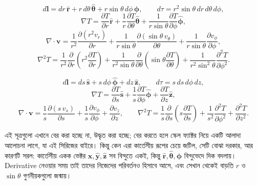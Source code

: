 \documentclass[11pt]{article}
\begin{document}
\begin{idea}[Spherical স্থানাঙ্কে]
\[
  d\mathbf{l} = dr\,\hat{\mathbf{r}} + r\,d\theta\,\hat{\boldsymbol{\theta}}
  + r\sin\theta\,d\phi\,\hat{\boldsymbol{\phi}}, \qquad
  d\tau = r^{2}\sin\theta\,dr\,d\theta\,d\phi ,
\]
\[
  \nabla T = \frac{\partial T}{\partial r}\hat{\mathbf{r}}
  + \frac{1}{r}\frac{\partial T}{\partial\theta}\hat{\boldsymbol{\theta}}
  + \frac{1}{r\sin\theta}\frac{\partial T}{\partial\phi}
  \hat{\boldsymbol{\phi}} ,
\]
\[
  \nabla\cdot\mathbf{v} = \frac{1}{r^{2}}
  \frac{\partial\left( r^{2}v_{r} \right)}{\partial r}
  + \frac{1}{r\sin\theta}
  \frac{\partial\left( \sin\theta\,v_{\theta} \right)}{\partial\theta}
  + \frac{1}{r\sin\theta}\frac{\partial v_{\phi}}{\partial\phi} ,
\]
\[
  \nabla^{2}T = \frac{1}{r^{2}}\frac{\partial}{\partial r}
  \left( r^{2}\frac{\partial T}{\partial r} \right)
  + \frac{1}{r^{2}\sin\theta}\frac{\partial}{\partial\theta}
  \left( \sin\theta\frac{\partial T}{\partial\theta} \right)
  + \frac{1}{r^{2}\sin^{2}\theta}\frac{\partial^{2}T}{\partial\phi^{2}} .
\]
\end{idea}

\begin{idea}[Cylindrical স্থানাঙ্কে]
\[
  d\mathbf{l} = ds\,\hat{\mathbf{s}} + s\,d\phi\,\hat{\boldsymbol{\phi}}
  + dz\,\hat{\mathbf{z}}, \qquad d\tau = s\,ds\,d\phi\,dz ,
\]
\[
  \nabla T = \frac{\partial T}{\partial s}\hat{\mathbf{s}}
  + \frac{1}{s}\frac{\partial T}{\partial\phi}\hat{\boldsymbol{\phi}}
  + \frac{\partial T}{\partial z}\hat{\mathbf{z}} ,
\]
\[
  \nabla\cdot\mathbf{v} = \frac{1}{s}
  \frac{\partial\left( s\,v_{s} \right)}{\partial s}
  + \frac{1}{s}\frac{\partial v_{\phi}}{\partial\phi}
  + \frac{\partial v_{z}}{\partial z}, \qquad
  \nabla^{2}T = \frac{1}{s}\frac{\partial}{\partial s}
  \left( s\frac{\partial T}{\partial s} \right)
  + \frac{1}{s^{2}}\frac{\partial^{2}T}{\partial\phi^{2}}
  + \frac{\partial^{2}T}{\partial z^{2}} .
\]
\end{idea}

এই সূত্রগুলো এখানে বের করা হচ্ছে না, উদ্ধৃত করা হচ্ছে; বের করতে হলে
স্কেল ফ্যাক্টর নিয়ে একটি আলাদা আলোচনা লাগে, যা এই সিরিজের বাইরে। কিন্তু
কেন এরা কার্তেসীয় রূপের চেয়ে জটিল, সেটি বোঝা দরকার, আর কারণটি সরল:
কার্তেসীয় একক ভেক্টর $\hat{\mathbf{x}}, \hat{\mathbf{y}}, \hat{\mathbf{z}}$
সব বিন্দুতে একই, কিন্তু $\hat{\mathbf{r}}, \hat{\boldsymbol{\theta}},
\hat{\boldsymbol{\phi}}$ বিন্দুভেদে দিক বদলায়। Derivative নেওয়ার সময় তাই
তাদের নিজেদের পরিবর্তনও হিসাবে আসে, এবং সেখান থেকেই বাড়তি $r$ ও
$\sin\theta$ গুণনীয়কগুলো জন্মায়।
\end{document}
